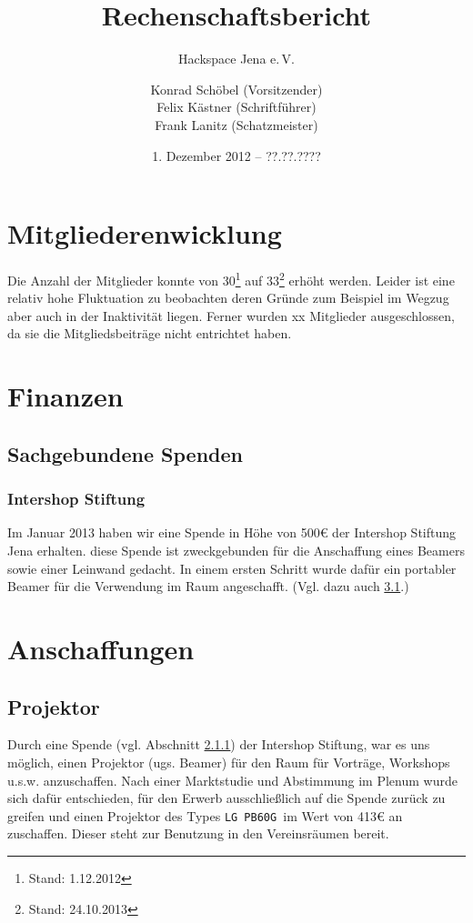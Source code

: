 \documentclass[10pt,DIV16]{scrartcl}
\title{Rechenschaftsbericht}
\subtitle{Hackspace Jena e.\,V.}
\author{%
	Konrad Schöbel (Vorsitzender)\\
    Felix Kästner (Schriftführer)\\
	Frank Lanitz (Schatzmeister)
}
\date{1. Dezember 2012 -- ??.??.????}
\begin{document}
\maketitle{}

\tableofcontents{}

\newpage{}

\section{Mitgliederenwicklung}

Die Anzahl der Mitglieder konnte von 30\footnote{Stand: 1.12.2012} auf
33\footnote{Stand: 24.10.2013} erhöht werden. Leider ist eine relativ
hohe Fluktuation zu beobachten deren Gründe zum Beispiel im Wegzug aber
auch in der Inaktivität liegen. Ferner wurden xx Mitglieder
ausgeschlossen, da sie die Mitgliedsbeiträge nicht entrichtet haben.

\section{Finanzen}

\subsection{Sachgebundene Spenden}
\subsubsection{Intershop Stiftung}
\label{sec:iss-spende}
Im Januar 2013 haben wir eine Spende in Höhe von 500\euro{} der Intershop
Stiftung Jena erhalten. diese Spende ist zweckgebunden für die
Anschaffung eines Beamers sowie einer Leinwand gedacht. In einem
ersten Schritt wurde dafür ein portabler Beamer für die Verwendung
im Raum angeschafft. (Vgl. dazu auch \ref{sec:beamerkauf}.)

\section{Anschaffungen}

\subsection{Projektor}
\label{sec:beamerkauf}

Durch eine Spende (vgl. Abschnitt \ref{sec:iss-spende}) der
Intershop Stiftung, war es uns möglich, einen Projektor (ugs. Beamer) für den Raum
für Vorträge, Workshops u.s.w. anzuschaffen. Nach einer Marktstudie
und Abstimmung im Plenum wurde sich dafür entschieden, für den
Erwerb ausschließlich auf die Spende zurück zu greifen und einen
Projektor des Types \texttt{LG PB60G }im Wert von 413\euro{} an
zuschaffen. Dieser steht zur Benutzung in den Vereinsräumen bereit.
\end{document}
